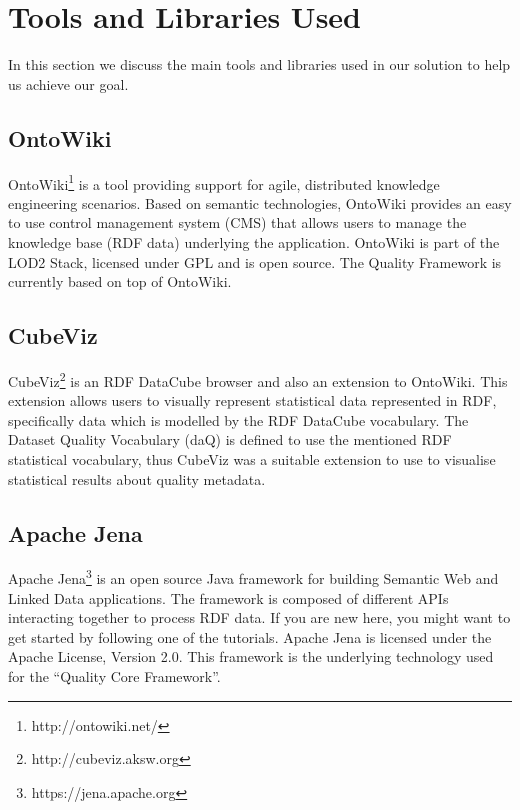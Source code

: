 
\section{Tools and Libraries Used}
\label{sec:Libraries} 

In this section we discuss the main tools and libraries used in our solution to help us achieve our goal.

\subsection{OntoWiki}
\label{sec:OntoWiki}
OntoWiki\footnote{http://ontowiki.net/} is a tool providing support for agile, distributed knowledge engineering scenarios.
Based on semantic technologies, OntoWiki provides an easy to use control management system (CMS) that allows users to manage the knowledge base (RDF data) underlying the application.
OntoWiki is part of the LOD2 Stack, licensed under GPL and is open source.
The Quality Framework is currently based on top of OntoWiki.

\subsection{CubeViz}
\label{sec:CubeViz}
CubeViz\footnote{http://cubeviz.aksw.org} is an RDF DataCube browser and also an extension to OntoWiki.
This extension allows users to visually represent statistical data represented in RDF, specifically data which is modelled by the RDF DataCube vocabulary.
The Dataset Quality Vocabulary (daQ) is defined to use the mentioned RDF statistical vocabulary, thus CubeViz was a suitable extension to use to visualise statistical results about quality metadata.


\subsection{Apache Jena}
\label{sec:Jena}
Apache Jena\footnote{https://jena.apache.org} is an open source Java framework for building Semantic Web and Linked Data applications.
The framework is composed of different APIs interacting together to process RDF data. If you are new here, you might want to get started by following one of the tutorials.
Apache Jena is licensed under the Apache License, Version 2.0. 
This framework is the underlying technology used for the ``Quality Core Framework''.

